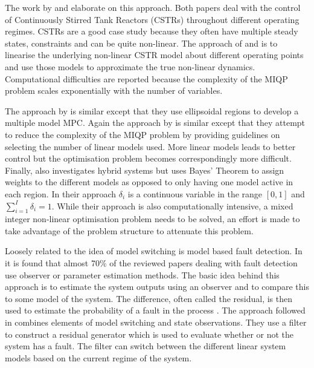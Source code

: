 The work by \cite{du} and \cite{sakakura} elaborate on this approach. Both papers deal with the control of Continuously Stirred Tank Reactors (CSTRs) throughout different operating regimes. CSTRs are a good case study because they often have multiple steady states, constraints and can be quite non-linear. The approach of \cite{du} and \cite{sakakura} is to linearise the underlying non-linear CSTR model about different operating points and use those models to approximate the true non-linear dynamics. Computational difficulties are reported because the complexity of the MIQP problem scales exponentially with the number of variables.

The approach by \cite{ozkan} is similar except that they use ellipsoidal regions to develop a multiple model MPC. Again the approach by \cite{kvasnica} is similar except that they attempt to reduce the complexity of the MIQP problem by providing guidelines on selecting the number of linear models used. More linear models leads to better control but the optimisation problem becomes correspondingly more difficult. Finally, \cite {nandola} also investigates hybrid systems but uses Bayes' Theorem to assign weights to the different models as opposed to only having one model active in each region. In their approach $\delta_i$ is a continuous variable in the range $[0, 1]$ and $\sum_{i=1}^I \delta_i = 1$. While their approach is also computationally intensive, a mixed integer non-linear optimisation problem needs to be solved, an effort is made to take advantage of the problem structure to attenuate this problem.

Loosely related to the idea of model switching is model based fault detection. In \cite{isermann} it is found that almost 70\% of the reviewed papers dealing with fault detection use observer or parameter estimation methods. The basic idea behind this approach is to estimate the system outputs using an observer and to compare this to some model of the system. The difference, often called the residual, is then used to estimate the probability of a fault in the process \cite{edwards}. The approach followed in \cite{wang} combines elements of model switching and state observations. They use a filter to construct a residual generator which is used to evaluate whether or not the system has a fault. The filter can switch between the different linear system models based on the current regime of the system. 

